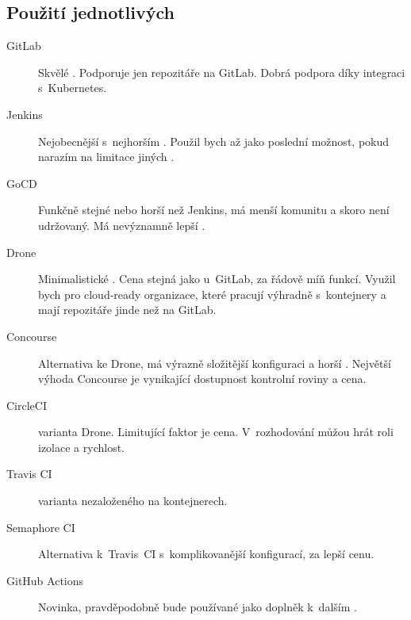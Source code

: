     \subsection{Použití jednotlivých \CI}
        \begin{description}
            \item[GitLab] Skvělé \CI. Podporuje jen repozitáře na GitLab. Dobrá podpora \CD díky integraci s~Kubernetes.
            \item[Jenkins] Nejobecnější \CI s~nejhorším . Použil bych až jako poslední možnost, pokud narazím na limitace jiných \CI.
            \item[GoCD] Funkčně stejné nebo horší než Jenkins, má menší komunitu a skoro není udržovaný. Má nevýznamně lepší .
            \item[Drone] Minimalistické \CI. Cena stejná jako u~GitLab, za řádově míň funkcí. Využil bych pro cloud-ready organizace, které pracují výhradně s~kontejnery a mají repozitáře jinde než na GitLab.
            \item[Concourse] Alternativa ke Drone, má výrazně složitější konfiguraci a horší . Největší výhoda Concourse je vynikající dostupnost kontrolní roviny a cena.
            \item[CircleCI]  varianta Drone. Limitující faktor je cena. V~rozhodování můžou hrát roli izolace a rychlost.
            \item[Travis CI]  varianta \CI nezaloženého na kontejnerech.
            \item[Semaphore CI] Alternativa k~Travis~CI s~komplikovanější konfigurací, za lepší cenu.
            \item[GitHub Actions] Novinka, pravděpodobně bude používané jako doplněk k~dalším \CI.
        \end{description}
